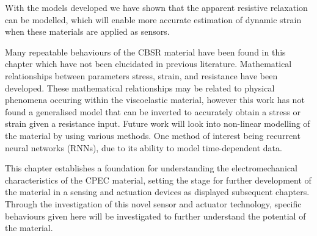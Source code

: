 With the models developed we have shown that the apparent resistive relaxation can be modelled, which will enable more accurate estimation of dynamic strain when these materials are applied as sensors. 

Many repeatable behaviours of the CBSR material have been found in this chapter which have not been elucidated in previous literature. Mathematical relationships between parameters stress, strain, and resistance have been developed. These mathematical relationships may be related to physical phenomena occuring within the viscoelastic material, however this work has not found a generalised model that can be inverted to accurately obtain a stress or strain given a resistance input. Future work will look into non-linear modelling of the material by using various methods. One method of interest being recurrent neural networks (RNNs), due to its ability to model time-dependent data.

This chapter establishes a foundation for understanding the electromechanical characteristics of the CPEC material, setting the stage for further development of the material in a sensing and actuation devices as displayed subsequent chapters. Through the investigation of this novel sensor and actuator technology, specific behaviours given here will be investigated to further understand the potential of the material.


\afterpage{\blankpage}